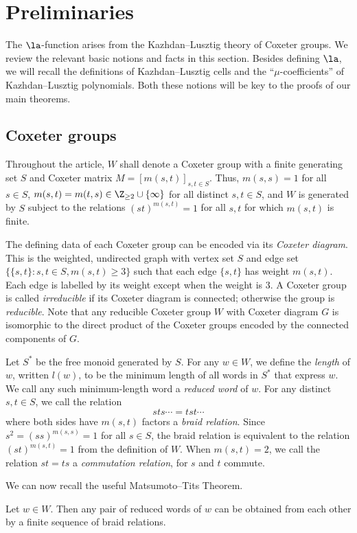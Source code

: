 \section{Preliminaries}\label{Sect2}
The $\la$-function arises from the Kazhdan--Lusztig theory of Coxeter groups. We
review the relevant basic notions and facts in this section. Besides defining $\la$, we will recall the definitions of Kazhdan--Lusztig cells and the
``$\mu$-coefficients'' of Kazhdan--Lusztig polynomials. Both these notions will be key
to the proofs of our main theorems.

\subsection{Coxeter groups} 
\label{Coxeter def}
Throughout the article, $W$ shall denote a Coxeter
group with a finite generating set $S$ and Coxeter matrix $M=[m(s,t)]_{s,t\in S}$. Thus,
$m(s,s)=1$ for all $s\in S$, $m(s,t)=m(t,s)\in \Z_{\ge 2}\cup \{\infty\}$ for all
distinct $s,t\in S$, and $W$ is generated by $S$ subject to the relations
$(st)^{m(s,t)}=1$ for all $s,t$ for which $m(s,t)$ is finite. 
%
%
%
%


The defining data of each Coxeter group can be encoded via its \emph{Coxeter diagram}.
This is the weighted, undirected graph with vertex set $S$ and edge set
$\{\{s,t\}:s,t\in S,m(s,t)\ge 3\}$ such that each edge $\{s,t\}$ has weight
$m(s,t)$. Each edge is labelled by its weight except when the weight is $3$. 
A Coxeter group is called \emph{irreducible} if its Coxeter diagram is
connected; otherwise the group is \emph{reducible}. Note that any reducible
Coxeter group $W$ with Coxeter diagram $G$ is isomorphic to the direct product
of the Coxeter groups encoded by the connected components of $G$. 


Let $S^*$ be the free monoid generated by $S$. For any $w\in W$, we define the
\emph{length} of $w$, written $l(w)$, to be the minimum length of all words in
$S^*$ that express $w$. We call any such minimum-length word a \emph{reduced word} of
$w$. For any distinct $s,t\in S$, we call the relation
\[
 sts\cdots=tst\cdots 
\] 
where both sides have $m(s,t)$ factors a \emph{braid relation}. Since
$s^2=(ss)^{m(s,s)}=1$ for all $s\in S$, the
braid relation is equivalent to
the relation $(st)^{m(s,t)}=1$ from the definition of $W$. When $m(s,t)=2$, we call the relation $st=ts$ a \emph{commutation
relation}, for $s$ and $t$ commute. 

We can now recall the useful Matsumoto--Tits Theorem.
\begin{prop}
 \label{Matsumoto-Tits}
 Let $w\in W$. Then any pair of reduced words of $w$ can be obtained from each
 other by a finite sequence of braid relations.
\end{prop}


